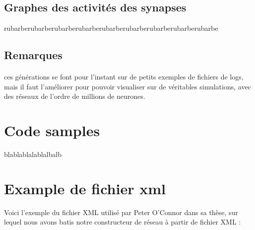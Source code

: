 \documentclass[a4paper,10pt]{article}
\begin{document}
\subsection{Graphes des activités des synapses}

rubarberubarberubarberubarberubarberubarberubarberubarberubarbe

\subsection*{Remarques}
\paragraph{}
ces générations se font pour l’instant sur de petits exemples de fichiers de logs, mais il faut l’améliorer pour pouvoir visualiser sur de véritables simulations, avec des réseaux de l’ordre de millions de neurones.

\appendix
\section{Code samples}

blablablalablalbalb

\section{Example de fichier xml}

Voici l'exemple du fichier XML utilisé par Peter O'Connor dans sa thèse, sur lequel nous avons batis notre constructeur de réseau à partir de fichier XML :
 
 
\end{document}
